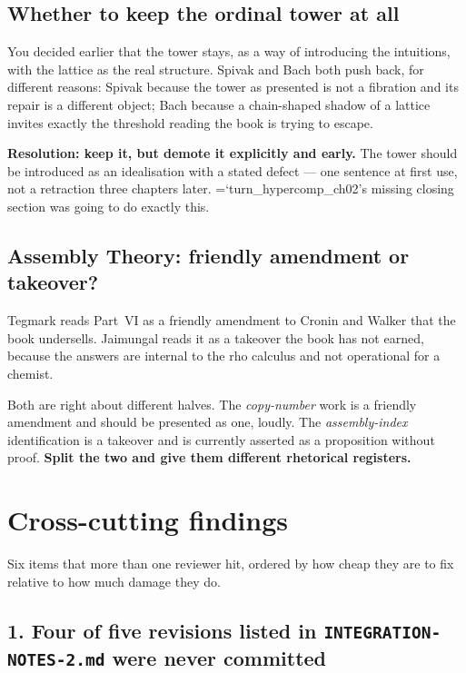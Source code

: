 \documentclass[11pt,letterpaper]{article}
\newcommand{\loc}[1]{{\small\ttfamily\color{accent}\hyphenchar\font=`\-\relax #1}}
\newcommand{\fnd}[1]{\textbf{\color{warn}#1}}
\begin{document}
\subsection*{Whether to keep the ordinal tower at all}

You decided earlier that the tower stays, as a way of introducing the
intuitions, with the lattice as the real structure. Spivak and Bach
both push back, for different reasons: Spivak because the tower as
presented is not a fibration and its repair is a different object;
Bach because a chain-shaped shadow of a lattice invites exactly the
threshold reading the book is trying to escape.

\fnd{Resolution: keep it, but demote it explicitly and early.} The
tower should be introduced as an idealisation with a stated defect ---
one sentence at first use, not a retraction three chapters later.
\loc{turn\_hypercomp\_ch02}'s missing closing section was going to do
exactly this.

\subsection*{Assembly Theory: friendly amendment or takeover?}

Tegmark reads Part~VI as a friendly amendment to Cronin and Walker
that the book undersells. Jaimungal reads it as a takeover the book has
not earned, because the answers are internal to the rho calculus and
not operational for a chemist.

Both are right about different halves. The \emph{copy-number} work is a
friendly amendment and should be presented as one, loudly. The
\emph{assembly-index} identification is a takeover and is currently
asserted as a proposition without proof. \fnd{Split the two and give
them different rhetorical registers.}

\clearpage
\section{Cross-cutting findings}
\label{sec:cross}

Six items that more than one reviewer hit, ordered by how cheap they
are to fix relative to how much damage they do.

\subsection*{1. Four of five revisions listed in
\texttt{INTEGRATION-NOTES-2.md} were never committed}
\end{document}
